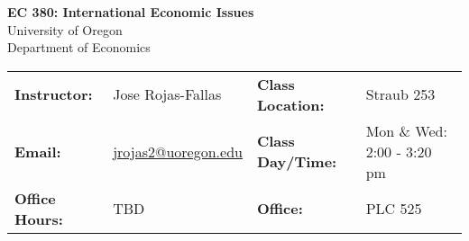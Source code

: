 \begin{center}
\textbf{\huge EC 380: International Economic Issues}\\ 
\vspace{0.1in}
University of Oregon\\ 
Department of Economics\\ 
\end{center}
\vspace{-.2in}
\begin{center}\begin{tabular}{llll}
\toprule
    \textbf{Instructor:} & \footnotesize{Jose Rojas-Fallas} & \textbf{Class Location:}  & {\footnotesize Straub 253} \\ 
    \textbf{Email:} & \footnotesize{\href{mailto:jrojas2@uoregon.edu}{jrojas2@uoregon.edu}} & \textbf{Class Day/Time:} & \footnotesize{Mon \& Wed: 2:00 - 3:20 pm} \\
    \textbf{Office Hours:} & \footnotesize{TBD} & \textbf{Office:} & \footnotesize{PLC 525}\\
\bottomrule
\end{tabular}
\end{center}